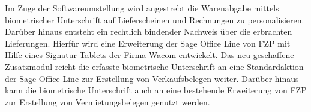 Im Zuge der Softwareumstellung wird angestrebt die Warenabgabe mittels biometrischer Unterschrift auf Lieferscheinen und Rechnungen zu personalisieren. Darüber hinaus entsteht ein rechtlich bindender Nachweis über die erbrachten Lieferungen. Hierfür wird eine Erweiterung der Sage Office Line von FZP mit Hilfe eines Signatur-Tablets der Firma Wacom entwickelt. Das neu geschaffene Zusatzmodul reicht die erfasste biometrische Unterschrift an eine Standardaktion der Sage Office Line zur Erstellung von Verkaufsbelegen weiter. Darüber hinaus kann die biometrische Unterschrift auch an eine bestehende Erweiterung von FZP zur Erstellung von Vermietungsbelegen genutzt werden. \cite{einleitung1}